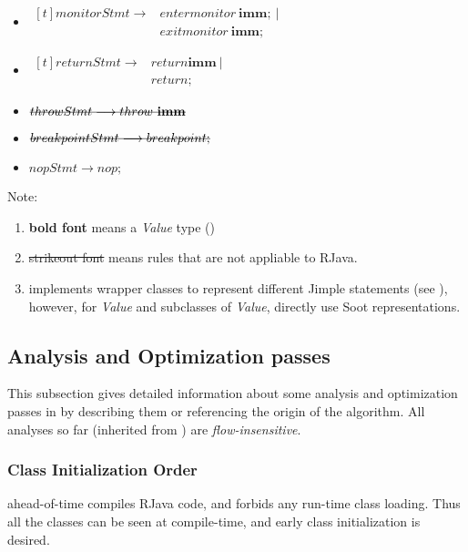 \documentclass[12pt]{article}
\begin{document}
\begin{itemize}
\item
$\begin{aligned}[t]
monitorStmt \longrightarrow &entermonitor~\mathbf{imm};~|\\
&exitmonitor~\mathbf{imm};
\end{aligned}$

\item
$\begin{aligned}[t]
returnStmt \longrightarrow &return \mathbf{imm}~|\\
&return;
\end{aligned}$

\item
$\msout{throwStmt \longrightarrow throw~\mathbf{imm}}$

\item
$\msout{breakpointStmt \longrightarrow breakpoint;}$

\item
$nopStmt \longrightarrow nop;$
\end{itemize}

\noindent
Note: 
\begin{enumerate}
\item \textbf{bold font} means a \emph{Value} type ()
\item \sout{strikeout font} means rules that are not appliable to RJava. 
\item \rjc implements wrapper classes to represent different Jimple statements
(see ), 
however, for \emph{Value} and subclasses of \emph{Value}, \rjc
directly use Soot representations. 
\end{enumerate}

\subsection{Analysis and Optimization passes}

This subsection gives detailed information about some analysis and optimization passes
in \rjc by describing them or referencing the origin of the algorithm. 
All analyses so far (inherited from )
are \emph{flow-insensitive}. 

\subsubsection{Class Initialization Order}

\rjc ahead-of-time compiles RJava code, and forbids any run-time class loading. 
Thus all the classes can be seen at compile-time, and early class initialization is desired. 
\end{document}
